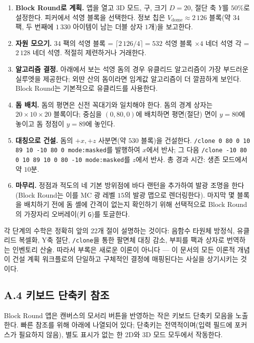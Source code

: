 \documentclass[12pt,a4paper]{scrartcl}
\newcommand{\code}[1]{\texttt{\small #1}}
\newcommand{\cmd}[1]{\textcolor{earth}{\texttt{\small #1}}}
\begin{document}
\begin{enumerate}[leftmargin=1.6em,itemsep=0.3em,topsep=0.3em]
  \item \textbf{Block Round로 계획.} 앱을 열고 3D 모드, 구, 크기 $D=20$, 절단 축 $Y$를 $50\%$로 설정한다. 피커에서 석영 블록을 선택한다. 정보 칩은 $V_{\mathrm{dome}} \approx 2\,126$ 블록(약 $34$ 팩, 두 번째에 $1\,330$ 아이템이 남는 더블 상자 $1$개)을 보고한다.
  \item \textbf{자원 모으기.} $34$ 팩의 석영 블록 = $\lceil 2\,126/4 \rceil = 532$ 석영 블록 $\times 4$ 네더 석영 각 = $2\,128$ 네더 석영. 적절히 제련하거나 거래한다.
  \item \textbf{알고리즘 결정.} 아래에서 보는 석영 돔의 경우 유클리드 알고리즘이 가장 부드러운 실루엣을 제공한다; 외딴 산의 돔이라면 임계값 알고리즘이 더 깔끔하게 보인다. Block Round는 기본적으로 유클리드를 사용한다.
  \item \textbf{돔 배치.} 돔의 평면은 신전 꼭대기와 일치해야 한다. 돔의 경계 상자는 $20 \times 10 \times 20$ 블록이다; 중심을 $(0,80,0)$에 배치하면 평면(절단) 면이 $y=80$에 놓이고 돔 정점이 $y=89$에 놓인다.
  \item \textbf{대칭으로 건설.} 돔의 $+x, +z$ 사분면(약 $530$ 블록)을 건설한다. \cmd{/clone 0 80 0 10 89 10 -10 80 0 mode:masked}를 발행하여 $x$에서 반사; 그 다음 \cmd{/clone -10 80 0 10 89 10 0 80 -10 mode:masked}를 $z$에서 반사. 총 경과 시간: 생존 모드에서 약 $10$분.
  \item \textbf{마무리.} 정점과 적도의 네 기본 방위점에 바다 랜턴을 추가하여 발광 조명을 한다(Block Round는 이를 MC 광 레벨 $15$의 발광 맵으로 렌더링한다). 마지막 몇 블록을 배치하기 전에 돔 셸에 간격이 없는지 확인하기 위해 선택적으로 Block Round의 가장자리 오버레이(키 \code{G})를 토글한다.
\end{enumerate}

각 단계의 수학은 정확히 앞의 22개 절이 설명하는 것이다: 음함수 타원체 방정식, 유클리드 복셀화, Y축 절단, \cmd{/clone}을 통한 팔면체 대칭 감소, 부피를 팩과 상자로 번역하는 인벤토리 산술. 따라서 부록은 새로운 이론이 아니다 — 이 문서의 모든 이론적 개념이 건설 계획 워크플로의 단일하고 구체적인 결정에 매핑된다는 사실을 상기시키는 것이다.

\subsection*{A.4 키보드 단축키 참조}

Block Round 앱은 캔버스의 모서리 버튼을 반영하는 작은 키보드 단축키 모음을 노출한다. 빠른 참조를 위해 아래에 나열되어 있다; 단축키는 전역적이며(입력 필드에 포커스가 필요하지 않음), 별도 표시가 없는 한 2D와 3D 모드 모두에서 작동한다.
\end{document}
